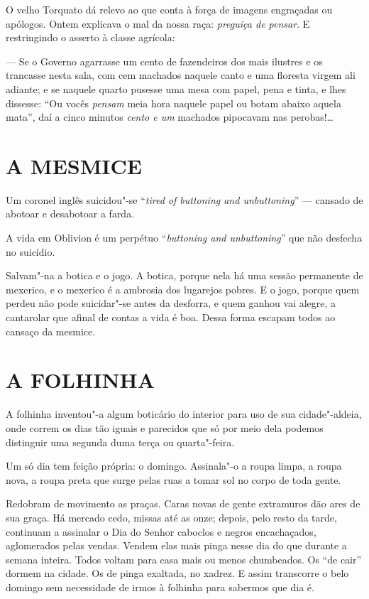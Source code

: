 O velho Torquato dá relevo ao que conta à força de imagens engraçadas ou
apólogos. Ontem explicava o mal da nossa raça: \emph{preguiça de
pensar}. E restringindo o asserto à classe agrícola:

--- Se o Governo agarrasse um cento de fazendeiros dos mais ilustres e
os trancasse nesta sala, com cem machados naquele canto e uma floresta
virgem ali adiante; e se naquele quarto pusesse uma mesa com papel, pena
e tinta, e lhes dissesse: ``Ou vocês \emph{pensam} meia hora naquele
papel ou botam abaixo aquela mata'', daí a cinco minutos \emph{cento e
um} machados pipocavam nas perobas!\ldots{}

\section*{A MESMICE}

Um coronel inglês suicidou"-se ``\emph{tired of buttoning and
unbuttoning}'' --- cansado de abotoar e desabotoar a farda.

A vida em Oblivion é um perpétuo ``\emph{buttoning and unbuttoning}''
que não desfecha no suicídio.

Salvam"-na a botica e o jogo. A botica, porque nela há uma sessão
permanente de mexerico, e o mexerico é a ambrosia dos lugarejos pobres.
E o jogo, porque quem perdeu não pode suicidar"-se antes da desforra, e
quem ganhou vai alegre, a cantarolar que afinal de contas a vida é boa.
Dessa forma escapam todos ao cansaço da mesmice.

\section*{A FOLHINHA}

A folhinha inventou"-a algum boticário do interior para uso de sua
cidade"-aldeia, onde correm os dias tão iguais e parecidos que só por
meio dela podemos distinguir uma segunda duma terça ou quarta"-feira.

Um só dia tem feição própria: o domingo. Assinala"-o a roupa limpa, a
roupa nova, a roupa preta que surge pelas ruas a tomar sol no corpo de
toda gente.

Redobram de movimento as praças. Caras novas de gente extramuros dão
ares de sua graça. Há mercado cedo, missas até as onze; depois, pelo
resto da tarde, continuam a assinalar o Dia do Senhor caboclos e negros
encachaçados, aglomerados pelas vendas. Vendem elas mais pinga nesse dia
do que durante a semana inteira. Todos voltam para casa mais ou menos
chumbeados. Os ``de cair'' dormem na cidade. Os de pinga exaltada, no
xadrez. E assim transcorre o belo domingo sem necessidade de irmos à
folhinha para sabermos que dia é.

